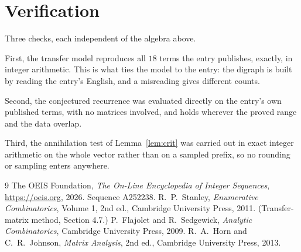 \documentclass[11pt,a4paper]{article}
\theoremstyle{plain}
\theoremstyle{definition}
\begin{document}
\section{Verification}

Three checks, each independent of the algebra above.

First, the transfer model reproduces all $18$ terms the entry publishes, exactly, in
integer arithmetic. This is what ties the model to the entry: the digraph is built by reading
the entry's English, and a misreading gives different counts.

Second, the conjectured recurrence was evaluated directly on the entry's own published terms,
with no matrices involved, and holds wherever the proved range and the data overlap.

Third, the annihilation test of Lemma~\ref{lem:crit} was carried out in exact integer
arithmetic on the whole vector rather than on a sampled prefix, so no rounding or sampling
enters anywhere.

\begin{thebibliography}{9}
 The OEIS Foundation, \emph{The On-Line Encyclopedia of Integer
Sequences}, \url{https://oeis.org}, 2026. Sequence A252238.
 R.~P.~Stanley, \emph{Enumerative Combinatorics}, Volume 1, 2nd ed.,
Cambridge University Press, 2011. (Transfer-matrix method, Section 4.7.)
 P.~Flajolet and R.~Sedgewick, \emph{Analytic Combinatorics}, Cambridge
University Press, 2009.
 R.~A.~Horn and C.~R.~Johnson, \emph{Matrix Analysis}, 2nd ed., Cambridge
University Press, 2013.
\end{thebibliography}
\end{document}
